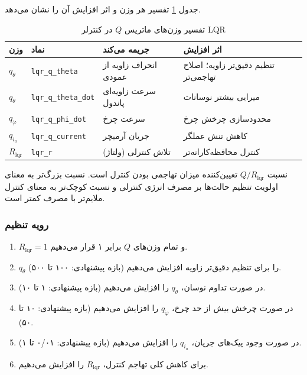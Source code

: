 جدول \ref{tab:lqr-weights} تفسیر هر وزن و اثر افزایش آن را نشان می‌دهد.

\begin{table}[H]
\centering
\caption{تفسیر وزن‌های ماتریس $Q$ در کنترلر LQR}
\label{tab:lqr-weights}
\begin{tabular}{@{}llll@{}}
\toprule
وزن & نماد & جریمه می‌کند & اثر افزایش \\
\midrule
$q_\theta$ & \texttt{lqr\_q\_theta} & انحراف زاویه از عمودی & تنظیم دقیق‌تر زاویه؛ اصلاح تهاجمی‌تر \\
$q_{\dot\theta}$ & \texttt{lqr\_q\_theta\_dot} & سرعت زاویه‌ای پاندول & میرایی بیشتر نوسانات \\
$q_{\dot\varphi}$ & \texttt{lqr\_q\_phi\_dot} & سرعت چرخ & محدودسازی چرخش چرخ \\
$q_{i_a}$ & \texttt{lqr\_q\_current} & جریان آرمیچر & کاهش تنش عملگر \\
$R_{\text{lqr}}$ & \texttt{lqr\_r} & تلاش کنترلی (ولتاژ) & کنترل محافظه‌کارانه‌تر \\
\bottomrule
\end{tabular}
\end{table}

نسبت $Q/R_{\text{lqr}}$ تعیین‌کننده میزان تهاجمی بودن کنترل است. نسبت بزرگ‌تر به معنای اولویت تنظیم حالت‌ها بر مصرف انرژی کنترلی و نسبت کوچک‌تر به معنای کنترل ملایم‌تر با مصرف کمتر است.

\subsubsection{رویه تنظیم}

\begin{enumerate}[label=\arabic*.]
    \item $R_{\text{lqr}} = 1$ و تمام وزن‌های $Q$ برابر ۱ قرار می‌دهیم.
    \item $q_\theta$ را برای تنظیم دقیق‌تر زاویه افزایش می‌دهیم (بازه پیشنهادی: ۱۰۰ تا ۵۰۰).
    \item در صورت تداوم نوسان، $q_{\dot\theta}$ را افزایش می‌دهیم (بازه پیشنهادی: ۱ تا ۱۰).
    \item در صورت چرخش بیش از حد چرخ، $q_{\dot\varphi}$ را افزایش می‌دهیم (بازه پیشنهادی: ۱۰ تا ۵۰).
    \item در صورت وجود پیک‌های جریان، $q_{i_a}$ را افزایش می‌دهیم (بازه پیشنهادی: ۰/۰۱ تا ۱).
    \item برای کاهش کلی تهاجم کنترل، $R_{\text{lqr}}$ را افزایش می‌دهیم.
\end{enumerate}

